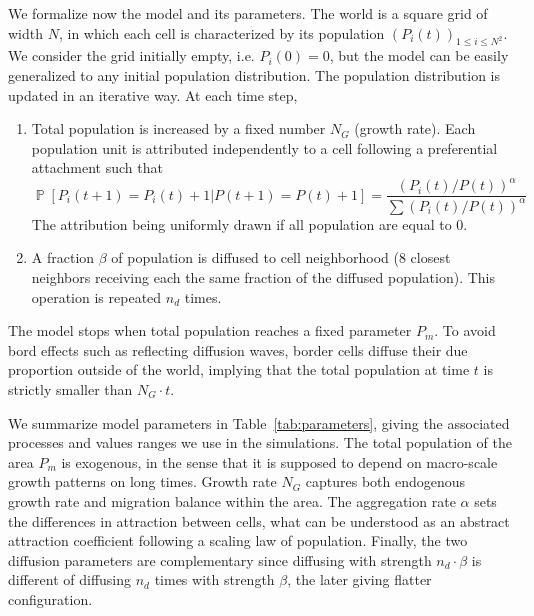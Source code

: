 \documentclass[10pt,letterpaper]{article}
\DeclareMathOperator{\Proba}{\mathbb{P}}
\newcommand{\Pb}[1]{\ensuremath{\Proba\!\left[#1\right]}}
\begin{document}
We formalize now the model and its parameters. The world is a square grid of width $N$, in which each cell is characterized by its population $(P_i(t))_{1\leq i\leq N^2}$. We consider the grid initially empty, i.e. $P_i(0)=0$, but the model can be easily generalized to any initial population distribution. The population distribution is updated in an iterative way. At each time step,

\begin{enumerate}
\item Total population is increased by a fixed number $N_G$ (growth rate). Each population unit is attributed independently to a cell following a preferential attachment such that 
\begin{equation}
\Pb{P_i(t+1)=P_i(t)+1|P(t+1)=P(t)+1}=\frac{(P_i(t)/P(t))^{\alpha}}{\sum(P_i(t)/P(t))^{\alpha}}
\end{equation}
The attribution being uniformly drawn if all population are equal to 0.
\item A fraction $\beta$ of population is diffused to cell neighborhood (8 closest neighbors receiving each the same fraction of the diffused population). This operation is repeated $n_d$ times.
\end{enumerate}

The model stops when total population reaches a fixed parameter $P_m$. To avoid bord effects such as reflecting diffusion waves, border cells diffuse their due proportion outside of the world, implying that the total population at time $t$ is strictly smaller than $N_G\cdot t$.

We summarize model parameters in Table~\ref{tab:parameters}, giving the associated processes and values ranges we use in the simulations. The total population of the area $P_m$ is exogenous, in the sense that it is supposed to depend on macro-scale growth patterns on long times. Growth rate $N_G$ captures both endogenous growth rate and migration balance within the area. The aggregation rate $\alpha$ sets the differences in attraction between cells, what can be understood as an abstract attraction coefficient following a scaling law of population. Finally, the two diffusion parameters are complementary since diffusing with strength $n_d\cdot \beta$ is different of diffusing $n_d$ times with strength $\beta$, the later giving flatter configuration.
\end{document}
